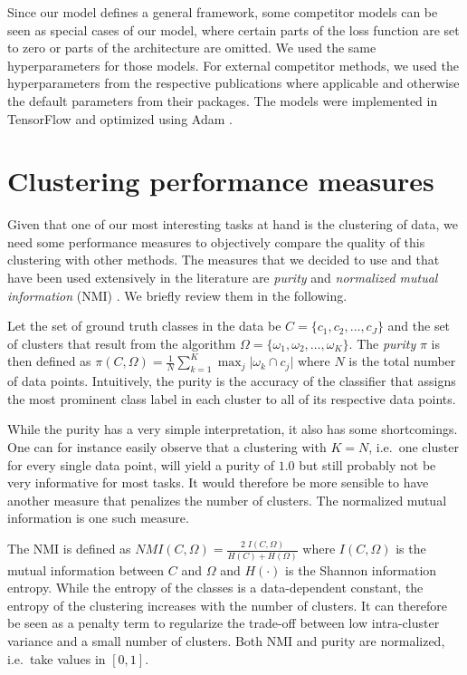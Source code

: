 Since our model defines a general framework, some competitor models can be seen as special cases of our model, where certain parts of the loss function are set to zero or parts of the architecture are omitted.
We used the same hyperparameters for those models.
For external competitor methods, we used the hyperparameters from the respective publications where applicable and otherwise the default parameters from their packages.
The models were implemented in TensorFlow \citep{GoogleResearch2015} and optimized using Adam \citep{Kingma2015}.


\section{Clustering performance measures}\label{sec:clustering_performance}

Given that one of our most interesting tasks at hand is the clustering of data, we need some performance measures to objectively compare the quality of this clustering with other methods.
The measures that we decided to use and that have been used extensively in the literature are \emph{purity} and \emph{normalized mutual information} (NMI) \citep{Manning2008}.
We briefly review them in the following.

Let the set of ground truth classes in the data be $C = \{ c_1, c_2, \dots, c_J \}$ and the set of clusters that result from the algorithm $\Omega = \{ \omega_1, \omega_2, \dots, \omega_K \}$.
The \emph{purity} $\pi$ is then defined as $\pi(C, \Omega) = \frac{1}{N} \sum_{k = 1}^K \max_j \vert \omega_k \cap c_j \vert$ where $N$ is the total number of data points.
Intuitively, the purity is the accuracy of the classifier that assigns the most prominent class label in each cluster to all of its respective data points.

While the purity has a very simple interpretation, it also has some shortcomings.
One can for instance easily observe that a clustering with $K = N$, i.e.\ one cluster for every single data point, will yield a purity of $1.0$ but still probably not be very informative for most tasks.
It would therefore be more sensible to have another measure that penalizes the number of clusters.
The normalized mutual information is one such measure.

The NMI is defined as $\textit{NMI}(C, \Omega) = \frac{2 \; I(C, \Omega)}{H(C) + H(\Omega)}$ where $I(C, \Omega)$ is the mutual information between $C$ and $\Omega$ and $H(\cdot)$ is the Shannon information entropy.
While the entropy of the classes is a data-dependent constant, the entropy of the clustering increases with the number of clusters.
It can therefore be seen as a penalty term to regularize the trade-off between low intra-cluster variance and a small number of clusters.
Both NMI and purity are normalized, i.e.\ take values in $[0,1]$.



